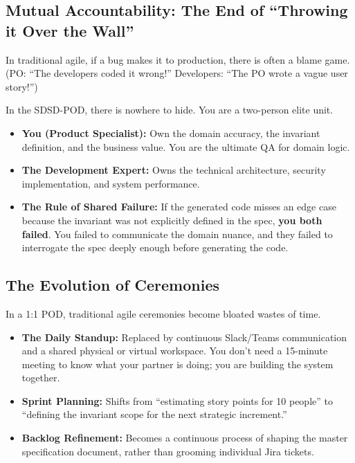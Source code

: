 \subsection{Mutual Accountability: The End of ``Throwing it Over the
Wall''}\label{mutual-accountability-the-end-of-throwing-it-over-the-wall}

In traditional agile, if a bug makes it to production, there is often a
blame game. (PO: ``The developers coded it wrong!'' Developers: ``The PO
wrote a vague user story!'')

In the SDSD-POD, there is nowhere to hide. You are a two-person elite
unit.

\begin{itemize}
\tightlist
\item
  \textbf{You (Product Specialist):} Own the domain accuracy, the
  invariant definition, and the business value. You are the ultimate QA
  for domain logic.
\item
  \textbf{The Development Expert:} Owns the technical architecture,
  security implementation, and system performance.
\item
  \textbf{The Rule of Shared Failure:} If the generated code misses an
  edge case because the invariant was not explicitly defined in the
  spec, \textbf{you both failed}. You failed to communicate the domain
  nuance, and they failed to interrogate the spec deeply enough before
  generating the code.
\end{itemize}

\subsection{The Evolution of
Ceremonies}\label{the-evolution-of-ceremonies}

In a 1:1 POD, traditional agile ceremonies become bloated wastes of
time.

\begin{itemize}
\tightlist
\item
  \textbf{The Daily Standup:} Replaced by continuous Slack/Teams
  communication and a shared physical or virtual workspace. You don't
  need a 15-minute meeting to know what your partner is doing; you are
  building the system together.
\item
  \textbf{Sprint Planning:} Shifts from ``estimating story points for 10
  people'' to ``defining the invariant scope for the next strategic
  increment.''
\item
  \textbf{Backlog Refinement:} Becomes a continuous process of shaping
  the master specification document, rather than grooming individual
  Jira tickets.
\end{itemize}

